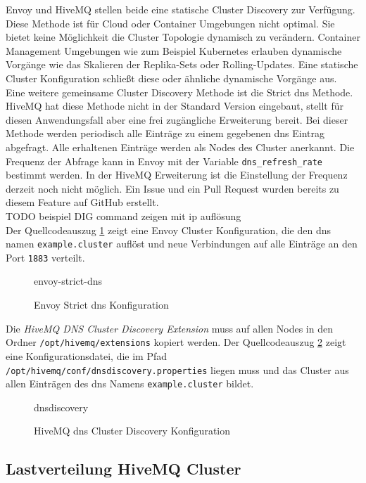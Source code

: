 Envoy und HiveMQ stellen beide eine statische Cluster Discovery zur Verfügung. Diese Methode ist für Cloud oder Container Umgebungen nicht optimal. Sie bietet keine Möglichkeit die Cluster Topologie dynamisch zu verändern. Container Management Umgebungen wie zum Beispiel Kubernetes erlauben dynamische Vorgänge wie das Skalieren der Replika-Sets oder Rolling-Updates. Eine statische Cluster Konfiguration schlie{\ss}t diese oder ähnliche dynamische Vorgänge aus.\\
Eine weitere gemeinsame Cluster Discovery Methode ist die Strict \ac{dns} Methode. HiveMQ hat diese Methode nicht in der Standard Version eingebaut, stellt für diesen Anwendungsfall aber eine frei zugängliche Erweiterung bereit.
Bei dieser Methode werden periodisch alle Einträge zu einem gegebenen \ac{dns} Eintrag abgefragt. Alle erhaltenen Einträge werden als Nodes des Cluster anerkannt. Die Frequenz der Abfrage kann in Envoy mit der Variable \verb|dns_refresh_rate| bestimmt werden. In der HiveMQ Erweiterung ist die Einstellung der Frequenz derzeit noch nicht möglich. Ein Issue \cite{AllowConfigurationDiscovery} und ein Pull Request \cite{ExponentialBackoffGeneral} wurden bereits zu diesem Feature auf GitHub erstellt.
\\
TODO beispiel DIG command zeigen mit ip auflösung
\\
Der Quellcodeauszug \ref{code:envoy-strict-dns} zeigt eine Envoy Cluster Konfiguration, die den \ac{dns} namen \verb|example.cluster| auflöst und neue Verbindungen auf alle Einträge an den Port \verb|1883| verteilt.
\begin{figure}
    {envoy-strict-dns}
    \caption{Envoy Strict \ac{dns} Konfiguration}
    \label{code:envoy-strict-dns}
\end{figure}
Die \textit{HiveMQ DNS Cluster Discovery Extension} \cite{HiveMQExtensionDNS} muss auf allen Nodes in den Ordner \verb|/opt/hivemq/extensions| kopiert werden. Der Quellcodeauszug \ref{code:hivemq-dnsdiscovery} zeigt eine Konfigurationsdatei, die im Pfad \verb|/opt/hivemq/conf/dnsdiscovery.properties| liegen muss und das Cluster aus allen Einträgen des \ac{dns} Namens \verb|example.cluster| bildet.
\begin{figure}
    {dnsdiscovery}
    \caption{HiveMQ \ac{dns} Cluster Discovery Konfiguration}
    \label{code:hivemq-dnsdiscovery}
\end{figure}

\subsection{Lastverteilung HiveMQ Cluster}

